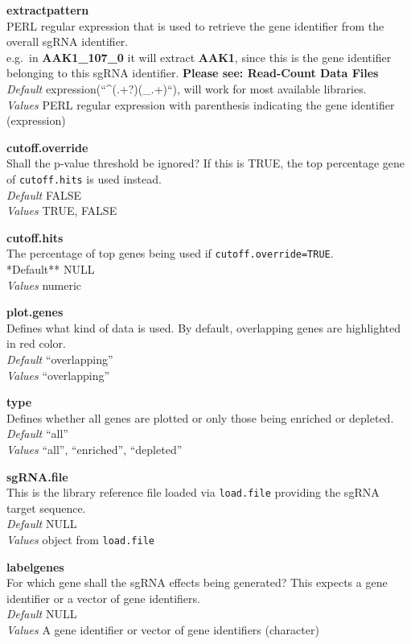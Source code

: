\documentclass[]{article}
\begin{document}
\textbf{extractpattern}\\
PERL regular expression that is used to retrieve the gene identifier
from the overall sgRNA identifier.\\
e.g.~in \textbf{AAK1\_107\_0} it will extract \textbf{AAK1}, since this
is the gene identifier belonging to this sgRNA identifier.
\textbf{Please see: Read-Count Data Files}\\
\emph{Default} expression(``\^{}(.+?)(\_.+)``), will work for most
available libraries.\\
\emph{Values} PERL regular expression with parenthesis indicating the
gene identifier (expression)

\textbf{cutoff.override}\\
Shall the p-value threshold be ignored? If this is TRUE, the top
percentage gene of \texttt{cutoff.hits} is used instead.\\
\emph{Default} FALSE\\
\emph{Values} TRUE, FALSE

\textbf{cutoff.hits}\\
The percentage of top genes being used if
\texttt{cutoff.override=TRUE}.\\
*Default** NULL\\
\emph{Values} numeric

\textbf{plot.genes}\\
Defines what kind of data is used. By default, overlapping genes are
highlighted in red color.\\
\emph{Default} ``overlapping''\\
\emph{Values} ``overlapping''

\textbf{type}\\
Defines whether all genes are plotted or only those being enriched or
depleted.\\
\emph{Default} ``all''\\
\emph{Values} ``all'', ``enriched'', ``depleted''

\textbf{sgRNA.file}\\
This is the library reference file loaded via \texttt{load.file}
providing the sgRNA target sequence.\\
\emph{Default} NULL\\
\emph{Values} object from \texttt{load.file}

\textbf{labelgenes}\\
For which gene shall the sgRNA effects being generated? This expects a
gene identifier or a vector of gene identifiers.\\
\emph{Default} NULL\\
\emph{Values} A gene identifier or vector of gene identifiers
(character)
\end{document}
